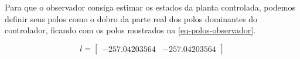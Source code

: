 \documentclass[
	12pt,				%
	article,			%
	openright,			%
	oneside,
	a4paper,			%
	chapter=TITLE,		%
	section=TITLE,		%
	english,			%
	french,				%
	spanish,			%
	brazil,				%
]{abntex2}
\begin{document}
\begin{figure}[htbp]
{
                    }
                \end{figure}
            
                Para que o observador consiga estimar os estados da planta controlada, podemos definir seus polos como o dobro da parte real dos polos dominantes do controlador, ficando com os polos mostrados na \autoref{eq-polos-observador}.
            
                \begin{equation}
                    \label{eq-polos-observador}
                    l = \begin{bmatrix}
                        -257.04203564 &-257.04203564
                        \end{bmatrix}
                \end{equation}
                
\end{document}
